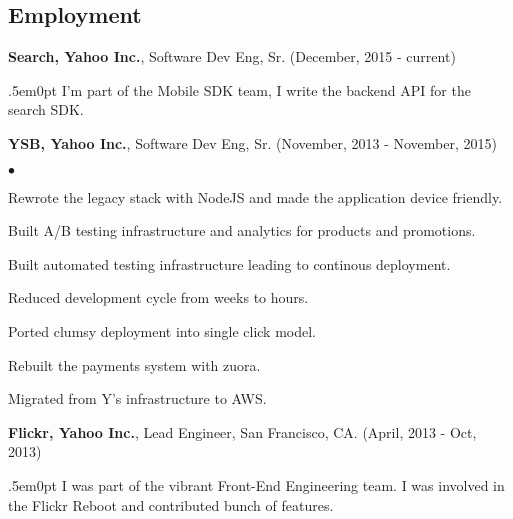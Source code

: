 \documentclass[margin, line, 10pt]{res}
\newenvironment{list2}{
  \begin{list}{$\bullet$}{%
      \setlength{\itemsep}{0in}
      \setlength{\parsep}{0in} \setlength{\parskip}{0in}
      \setlength{\topsep}{0in} \setlength{\partopsep}{0in}
      \setlength{\leftmargin}{0.2in}}}{\end{list}}
\begin{document}
\begin{resume}
\section{Employment}

{\Large {\bf Search, Yahoo Inc.}}, Software Dev Eng, Sr. (December, 2015 - current)\\
\begin{adjustwidth}{.5em}{0pt}
  I'm part of the Mobile SDK team, I write the backend API for the search SDK.
\end{adjustwidth}
\vspace{.05cm}

{\Large {\bf YSB, Yahoo Inc.}}, Software Dev Eng, Sr. (November, 2013 - November, 2015)\\
\vspace{-.1cm}
\begin{list2}
\vspace{.1cm}
\item Rewrote the legacy stack with NodeJS and made the application device friendly.
\item Built A/B testing infrastructure and analytics for products and promotions.
\item Built automated testing infrastructure leading to continous deployment.
\item Reduced development cycle from weeks to hours.
\item Ported clumsy deployment into single click model.
\item Rebuilt the payments system with zuora.
\item Migrated from Y's infrastructure to AWS.
\end{list2}
\vspace{.05cm}

{\Large {\bf Flickr, Yahoo Inc.}}, Lead Engineer, San Francisco, CA.  \hfill (April, 2013 - Oct, 2013)\\
\vspace{-.1cm}
\begin{adjustwidth}{.5em}{0pt}
  I was part of the vibrant Front-End Engineering team. I was involved in the Flickr Reboot and contributed bunch of features.
\end{adjustwidth}


\end{resume}
\end{document}
